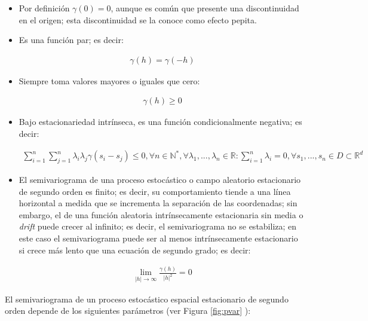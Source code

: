 \documentclass[
]{book}
\begin{document}
\begin{itemize}
\item
  Por definición \(\gamma(0)=0\), aunque es común que presente una discontinuidad en el origen; esta discontinuidad se la conoce como efecto pepita.
\item
  Es una función par; es decir:

  \begin{align*}
      \gamma(h)=\gamma(-h)  
    \end{align*}
\item
  Siempre toma valores mayores o iguales que cero:

  \begin{align*}
      \gamma(h)\geq 0  
    \end{align*}
\item
  Bajo estacionariedad intrínseca, es una función condicionalmente negativa; es decir:

  \begin{align*}
      \sum_{i=1}^n \sum_{j=1}^n\lambda_i \lambda_j \gamma(s_i-s_j)\leq 0,\forall n\in \mathbb{N}^*,\forall \lambda_1,...,\lambda_n \in \mathbb{R}:\sum_{i=1}^n\lambda_i=0, \forall s_1,...,s_n \in D \subset \mathbb{R}^d  
    \end{align*}
\item
  El semivariograma de una proceso estocástico o campo aleatorio estacionario de segundo orden es finito; es decir, su comportamiento tiende a una línea horizontal a medida que se incrementa la separación de las coordenadas; sin embargo, el de una función aleatoria intrínsecamente estacionaria sin media o \textit{drift} puede crecer al infinito; es decir, el semivariograma no se estabiliza; en este caso el semivariograma puede ser al menos intrínsecamente estacionario si crece más lento que una ecuación de segundo grado; es decir:

  \begin{align*}
      \lim_{|h|\to \infty}\frac{\gamma(h)}{|h|^2}=0  
    \end{align*}
\end{itemize}

El semivariograma de un proceso estocástico espacial estacionario de segundo orden depende de los siguientes parámetros (ver Figura \ref{fig:pvar} ):
\end{document}

